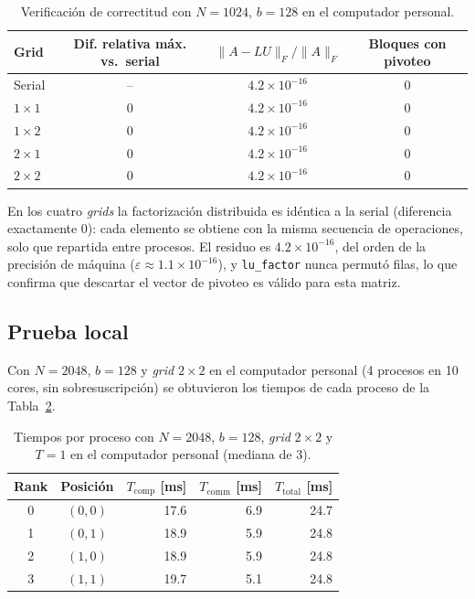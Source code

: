 \documentclass[11pt,a4paper]{article}
\newcommand{\Tcomp}{T_{\text{comp}}}
\newcommand{\Tcomm}{T_{\text{comm}}}
\newcommand{\Ttot}{T_{\text{total}}}
\begin{document}
\begin{table}[H]
\centering\small
\caption{Verificación de correctitud con $N=1024$, $b=128$ en el computador personal.}
\label{tab:verif}
\begin{tabular}{lccc}
\toprule
\textbf{Grid} & Dif. relativa máx. vs.\ serial & $\|A-LU\|_F/\|A\|_F$ & Bloques con pivoteo \\
\midrule
Serial & -- & $4.2\times10^{-16}$ & 0 \\
$1\times1$ & 0 & $4.2\times10^{-16}$ & 0 \\
$1\times2$ & 0 & $4.2\times10^{-16}$ & 0 \\
$2\times1$ & 0 & $4.2\times10^{-16}$ & 0 \\
$2\times2$ & 0 & $4.2\times10^{-16}$ & 0 \\
\bottomrule
\end{tabular}
\end{table}

En los cuatro \emph{grids} la factorización distribuida es idéntica a la serial (diferencia exactamente 0): cada elemento se obtiene con la misma secuencia de operaciones, solo que repartida entre procesos. El residuo es $4.2\times10^{-16}$, del orden de la precisión de máquina ($\varepsilon\approx1.1\times10^{-16}$), y \texttt{lu\_factor} nunca permutó filas, lo que confirma que descartar el vector de pivoteo es válido para esta matriz.

\subsection{Prueba local}
Con $N=2048$, $b=128$ y \emph{grid} $2\times2$ en el computador personal (4 procesos en 10 cores, sin sobresuscripción) se obtuvieron los tiempos de cada proceso de la Tabla~\ref{tab:blocal}.

\begin{table}[H]
\centering\small
\caption{Tiempos por proceso con $N=2048$, $b=128$, \emph{grid} $2\times2$ y $T=1$ en el computador personal (mediana de 3).}
\label{tab:blocal}
\begin{tabular}{ccrrr}
\toprule
Rank & Posición & $\Tcomp$ [ms] & $\Tcomm$ [ms] & $\Ttot$ [ms] \\
\midrule
0 & $(0,0)$ & 17.6 & 6.9 & 24.7 \\
1 & $(0,1)$ & 18.9 & 5.9 & 24.8 \\
2 & $(1,0)$ & 18.9 & 5.9 & 24.8 \\
3 & $(1,1)$ & 19.7 & 5.1 & 24.8 \\
\bottomrule
\end{tabular}
\end{table}
\end{document}
